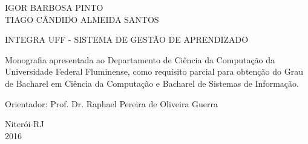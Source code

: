 

\begin{center}

IGOR BARBOSA PINTO\\
TIAGO CÂNDIDO ALMEIDA SANTOS

\vfill

INTEGRA UFF - SISTEMA DE GESTÃO DE APRENDIZADO

\vspace{3.0cm}

\begin{flushright}
\begin{minipage}{0.50\textwidth}

Monografia apresentada ao Departamento\linebreak
de Ciência da Computação da Universidade \linebreak
Federal Fluminense, como requisito parcial \linebreak
para obtenção do Grau de Bacharel em \linebreak
Ciência da Computação e \linebreak Bacharel de Sistemas de Informação.

\end{minipage}
\end{flushright}

\vspace{3.0cm}

Orientador: Prof. Dr. Raphael Pereira de Oliveira Guerra

\vfill

Niterói-RJ\\2016

\end{center}

\newpage